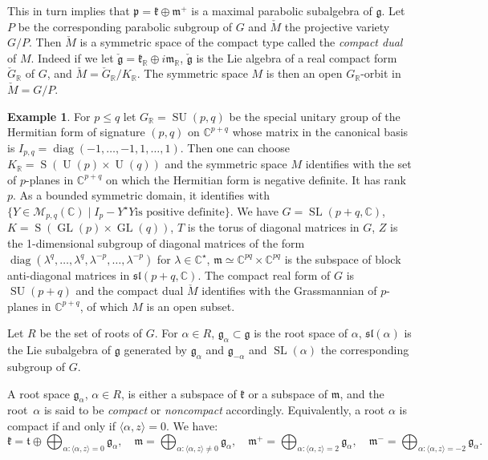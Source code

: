 \documentclass[10pt]{amsart}
\let\mathcal\mathscr
\theoremstyle{plain}
\theoremstyle{definition}
\newtheorem{exem}[theo]{Example}
\let\la\langle
\let\ra\rangle
\DeclareMathOperator{\diag}{diag}
\DeclareMathOperator{\GL}{GL}
\DeclareMathOperator{\rS}{S}
\DeclareMathOperator{\SL}{SL}
\DeclareMathOperator{\SU}{SU}
\DeclareMathOperator{\rU}{U}
\newcommand{\cM}{\mathcal{M}}
\newcommand{\bC}{\mathbb{C}}
\newcommand{\bR}{\mathbb{R}}
\newcommand{\fgg}{\mathfrak{g}}
\newcommand{\fk}{\mathfrak{k}}
\newcommand{\fm}{\mathfrak{m}}
\newcommand{\fp}{\mathfrak{p}}
\newcommand{\ft}{\mathfrak{t}}
\newcommand{\fsl}{\mathfrak{sl}}
\newcommand{\scal}[1]{\langle #1 \rangle}
\begin{document}
This in turn implies that $\fp=\fk\oplus\fm^+$ is a maximal parabolic subalgebra of $\fgg$. Let~$P$ be
the corresponding parabolic subgroup of $G$ and $\check{M}$ the projective variety $G/P$. Then
$\check{M}$ is a symmetric space of the compact type called the \emph{compact dual} of $M$. Indeed if
we let $\check{\fgg}=\fk_\bR\oplus i\fm_\bR$, $\check{\fgg}$ is the Lie algebra of a real compact form
$\check{G}_\bR$ of $G$, and $\check{M}=\check{G}_\bR/K_\bR$. The symmetric space $M$ is then an open
$G_\bR$-orbit in $\check{M}=G/P$.

\begin{exem}
\label{exem:su}
For $p\leq q$ let $G_\bR=\SU(p,q)$ be the special unitary group of the Hermitian form of
signature $(p,q)$ on $\bC^{p+q}$ whose matrix in the canonical basis is
$I_{p,q}=\diag(-1,\ldots,-1,1,\ldots,1)$. Then one can choose
$K_\bR=\rS(\rU(p)\times \rU(q))$ and the symmetric space $M$ identifies with the set of
$p$-planes in $\bC^{p+q}$ on which the Hermitian form is negative definite. It has rank $p$. As a
bounded symmetric domain, it identifies with $\{Y\in\cM_{p,q}(\bC)\mid I_p-Y^\star Y\mbox{
is positive definite} \}$. We have
$G=\SL(p+q,\bC)$, $K=\rS(\GL(p)\times
\GL(q))$, $T$ is the torus of diagonal matrices in $G$, $Z$ is the 1-dimensional subgroup of
diagonal matrices of the form
$\diag(\lambda^q,\ldots,\lambda^q,\lambda^{-p},\ldots,\lambda^{-p})$
for $\lambda\in\bC^\star$,
$\fm\simeq \bC^{pq}\times\bC^{pq}$ is the subspace of block anti-diagonal matrices in
$\fsl(p+q,\bC)$. The compact real form of $G$ is $\SU(p+q)$ and the compact dual
$\check{M}$ identifies with the Grassmannian of $p$-planes in $\bC^{p+q}$, of which $M$ is an open
subset.
\end{exem}

Let $R$ be the set of roots of $G$. For $\alpha\in R$, $\fgg_\alpha\subset\fgg$ is the root space of $\alpha$,
$\fsl(\alpha)$ is the Lie subalgebra of $\fgg$ generated by $\fgg_\alpha$ and $\fgg_{-\alpha}$ and $\SL(\alpha)$ the
corresponding subgroup of $G$.

A root space $\fgg_\alpha$, $\alpha\in R$, is either a subspace of $\fk$ or a subspace of $\fm$, and the root~$\alpha$ is
said to be \emph{compact}
or \emph{noncompact} accordingly. Equivalently, a root $\alpha$ is compact if and only if
$\la\alpha,z\ra=0$. We have:
$$
\fk = \ft \oplus \bigoplus_{\alpha: \la\alpha,z\ra=0} \fgg_\alpha,\quad
\fm = \bigoplus_{\alpha: \la\alpha,z\ra\neq 0} \fgg_\alpha,\quad
\fm^+ = \bigoplus_{\alpha: \scal{\alpha,z}=2} \fgg_\alpha,\quad
\fm^- = \bigoplus_{\alpha: \scal{\alpha,z}=-2} \fgg_\alpha.
$$
\end{document}
